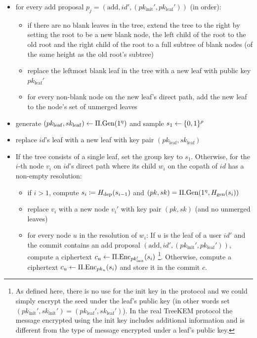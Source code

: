 \begin{definition}
\begin{itemize}
\begin{itemize}
\begin{itemize}
			            \end{itemize}
			      \item for every add proposal $p_j = (\mathrm{add}, id', (pk_{\mathrm{init}}', pk_{\mathrm{leaf}}'))$ (in order):
			            \begin{itemize}
				            \item if there are no blank leaves in the tree, extend the tree to the right by setting the root to be a new blank node, the left child of the root to the old root and the right child of the root to a full subtree of blank nodes (of the same height as the old root's subtree)
				            \item replace the leftmost blank leaf in the tree with a new leaf with public key $pk_{\mathrm{leaf}}'$
				            \item for every non-blank node on the new leaf's direct path, add the new leaf to the node's set of unmerged leaves
			            \end{itemize}
			      \item generate $(pk_{\mathrm{leaf}}, sk_{\mathrm{leaf}}) \leftarrow \Pi.\mathrm{Gen}(1^\eta)$ and sample $s_1 \leftarrow \{0, 1\}^\rho$
			      \item replace $id$'s leaf with a new leaf with key pair $(pk_{\mathrm{leaf}}, sk_{\mathrm{leaf}})$
			      \item If the tree consists of a single leaf, set the group key to $s_1$. Otherwise, for the $i$-th node $v_i$ on $id$'s direct path where its child $w_i$ on the copath of $id$ has a non-empty resolution:
			            \begin{itemize}
				            \item if $i > 1$, compute $s_i \coloneqq H_\mathrm{dep}(s_{i - 1})$ and $(pk, sk) = \Pi.\mathrm{Gen}(1^\eta, H_\mathrm{gen}(s_i))$
				            \item replace $v_i$ with a new node $v_i'$ with key pair $(pk, sk)$ (and no unmerged leaves)
				            \item for every node $u$ in the resolution of $w_i$: If $u$ is the leaf of a user $id'$ and the commit contains an add proposal $(\mathrm{add}, id', (pk_{\mathrm{init}}', pk_{\mathrm{leaf}}'))$, compute a ciphertext $c_u \leftarrow \Pi.\mathrm{Enc}_{pk_{\mathrm{init}}'}(s_i)$
				                  \footnote{As defined here, there is no use for the init key in the protocol and we could simply encrypt the seed under the leaf's public key (in other words set $(pk_{\mathrm{init}}', sk_{\mathrm{init}}') = (pk_{\mathrm{leaf}}', sk_{\mathrm{leaf}}')$). In the real TreeKEM protocol the message encrypted using the init key includes additional information and is different from the type of message encrypted under a leaf's public key.}. Otherwise, compute a ciphertext $c_u \leftarrow \Pi.\mathrm{Enc}_{pk_u}(s_i)$ and store it in the commit $c$.

\end{itemize}
\end{itemize}
\end{itemize}
\end{definition}
